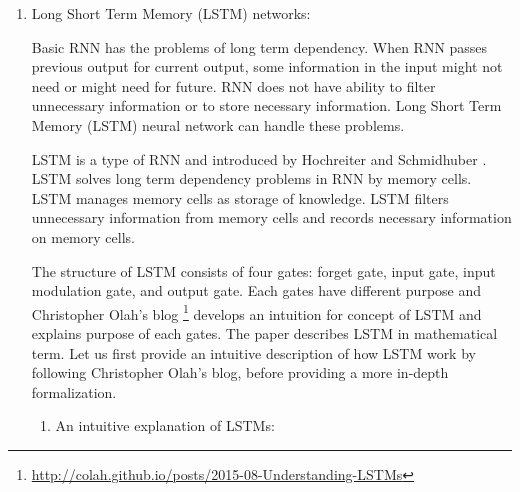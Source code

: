 \documentclass[draft,dvipsnames]{drexel-thesis}
\begin{document}
\begin{thesis}
\begin{enumerate}
\item Long Short Term Memory (LSTM) networks:

	Basic RNN has the problems of long term dependency. When RNN passes previous output for current output, some information in the input might not need or might need for future. RNN does not have ability to filter unnecessary information or to store necessary information. Long Short Term Memory (LSTM) neural network can handle these problems.
	
	LSTM is a type of RNN and introduced by Hochreiter and Schmidhuber \cite{hochreiter1997long}. LSTM solves long term dependency problems in RNN by memory cells. LSTM manages memory cells as storage of knowledge. LSTM filters unnecessary information from memory cells and records necessary information on memory cells.
	
	The structure of LSTM consists of four gates: forget gate, input gate, input modulation gate, and output gate. Each gates have different purpose and Christopher Olah's blog \footnote{\url{http://colah.github.io/posts/2015-08-Understanding-LSTMs}} develops an intuition for concept of LSTM and explains purpose of each gates. The paper \cite{zaremba2014recurrent}  describes LSTM in mathematical term. Let us first provide an intuitive description of how LSTM work by following Christopher Olah's blog, before providing a more in-depth formalization.
	
	

	
	\begin{enumerate}
	\item An intuitive explanation of LSTMs:
	

\end{enumerate}
\end{enumerate}
\end{thesis}
\end{document}
